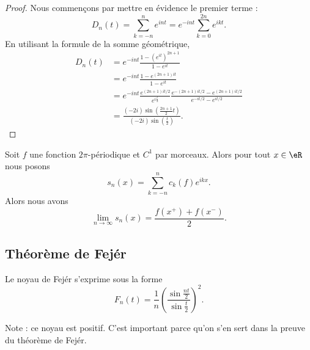 \begin{proof}
    Nous commençons par mettre en évidence le premier terme :
    \begin{equation}
        D_n(t)=\sum_{k=-n}^n e^{int}= e^{-int}\sum_{k=0}^{2n} e^{ikt}.
    \end{equation}
    En utilisant la formule de la somme géométrique,
    \begin{subequations}
        \begin{align}
            D_n(t)&= e^{-int}\frac{ 1-( e^{it})^{2n+1} }{ 1- e^{it} }\\
            &= e^{-int}\frac{ 1- e^{(2n+1)it} }{ 1- e^{it} }\\
            &= e^{-int}\frac{  e^{(2n+1)it/2} }{  e^{i\frac{ t }{ 2 }} }\frac{  e^{-(2n+1)it/2}- e^{(2n+1)it/2} }{  e^{-it/2}- e^{it/2} }\\
            &=\frac{ (-2i)\sin\left( \frac{ 2n+1 }{ 2 }t \right) }{ (-2i)\sin\left( \frac{ t }{2} \right) }.
        \end{align}
    \end{subequations}
\end{proof}

\begin{theorem}
    Soit \( f\) une fonction \( 2\pi\)-périodique et \( C^1\) par morceaux. Alors pour tout \( x\in \eR\) nous posons
    \begin{equation}
        s_n(x)=\sum_{k=-n}^nc_k(f) e^{ikx}.
    \end{equation}
    Alors nous avons
    \begin{equation}
        \lim_{n\to \infty} s_n(x)=\frac{ f(x^+)+f(x^-) }{ 2 }.
    \end{equation}
\end{theorem}

\subsection{Théorème de Fejér}

\begin{lemma}   \label{LemtCAjJz}
    Le noyau de Fejér s'exprime sous la forme
    \begin{equation}    \label{EqLOtzCf}
        F_n(t)=\frac{1}{ n }\left( \frac{ \sin\frac{ nt }{2} }{ \sin\frac{ t }{2} } \right)^2.
    \end{equation}
\end{lemma}
Note : ce noyau est positif. C'est important parce qu'on s'en sert dans la preuve du théorème de Fejér.

